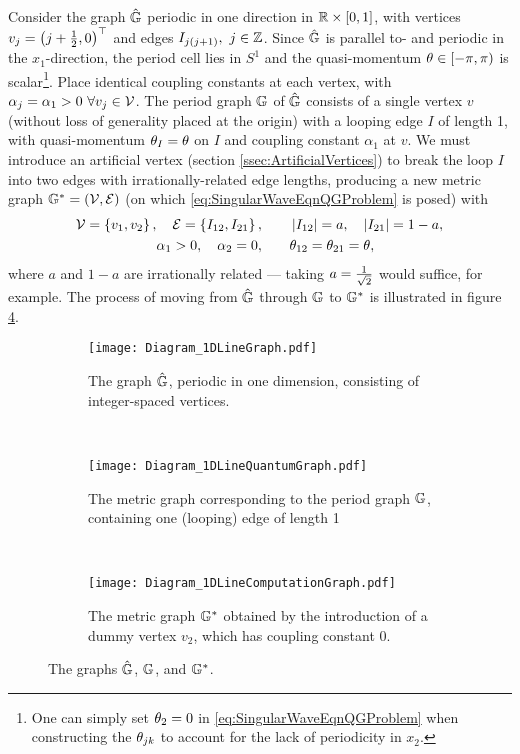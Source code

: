 Consider the graph $\hat{\mathbb{G}}$ periodic in one direction in $\mathbb{R}\times\left[ 0,1 \right]$, with vertices $v_j = \left( j + \frac{1}{2}, 0 \right)^\top$ and edges $I_{j\bracs{j+1}}, \ j\in\integers$.
Since $\hat{\mathbb{G}}$ is parallel to- and periodic in the $x_1$-direction, the period cell lies in $S^1$ and the quasi-momentum $\theta\in\left[-\pi,\pi\right)$ is scalar\footnote{One can simply set $\theta_2=0$ in \eqref{eq:SingularWaveEqnQGProblem} when constructing the $\theta_{jk}$ to account for the lack of periodicity in $x_2$.}.
Place identical coupling constants at each vertex, with $\alpha_j = \alpha_1>0 \ \forall v_j\in\mathcal{V}$.
The period graph $\mathbb{G}$ of $\hat{\mathbb{G}}$ consists of a single vertex $v$ (without loss of generality placed at the origin) with a looping edge $I$ of length 1, with quasi-momentum $\theta_I=\theta$ on $I$ and coupling constant $\alpha_1$ at $v$.
We must introduce an artificial vertex (section \ref{ssec:ArtificialVertices}) to break the loop $I$ into two edges with irrationally-related edge lengths, producing a new metric graph $\mathbb{G}^*=\left( \mathcal{V}, \mathcal{E} \right)$ (on which \eqref{eq:SingularWaveEqnQGProblem} is posed) with
\begin{align*}
	\mathcal{V} = \left\{  v_1 , v_2  \right\}, \quad \mathcal{E} = \left\{  I_{12}, I_{21}  \right\},
	&\qquad \left\lvert I_{12} \right\rvert = a, \quad \left\lvert I_{21} \right\rvert = 1-a,  \\
	\alpha_1 >0, \quad \alpha_2 = 0,
	&\qquad \theta_{12} = \theta_{21} = \theta,
\end{align*}
where $a$ and $1-a$ are irrationally related --- taking $a = \frac{1}{\sqrt{2}}$ would suffice, for example.
The process of moving from $\hat{\mathbb{G}}$ through $\mathbb{G}$ to $\mathbb{G}^*$ is illustrated in figure \ref{fig:Diagram_1DExample}.
\begin{figure}[t!]
	\centering
	\begin{subfigure}[t]{0.3\textwidth}
		\centering
		\texttt{[image: Diagram\_1DLineGraph.pdf]}
		\caption[]{\label{fig:Diagram_1DLineGraph} The graph $\hat{\mathbb{G}}$, periodic in one dimension, consisting of integer-spaced vertices.}
	\end{subfigure}
	~
	\begin{subfigure}[t]{0.3\textwidth}
		\centering
		\texttt{[image: Diagram\_1DLineQuantumGraph.pdf]}
		\caption[]{\label{fig:Diagram_1DLineQuantumGraph} The metric graph corresponding to the period graph $\mathbb{G}$, containing one (looping) edge of length 1}
	\end{subfigure}
	~
	\begin{subfigure}[t]{0.3\textwidth}
		\centering
		\texttt{[image: Diagram\_1DLineComputationGraph.pdf]}	
		\caption[]{\label{fig:Diagram_1DLineComputationGraph} The metric graph $\mathbb{G}^*$ obtained by the introduction of a dummy vertex $v_2$, which has coupling constant 0.}
	\end{subfigure}
	\caption[The 1D chain graph studied in the example of section \ref{ssec:Example1DLoop}.]{\label{fig:Diagram_1DExample} The graphs $\hat{\mathbb{G}}$, $\mathbb{G}$, and $\mathbb{G}^*$.}
\end{figure} \newline

